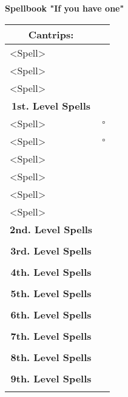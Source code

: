 \documentclass[11pt]{article}
\newcommand{\done}{\rlap{$\square$}{\raisebox{2pt}{\large\hspace{1pt}\ding{51}}}}
\newcommand{\available}{$\square$}
\begin{document}
	\begin{center}
{\LARGE \textbf{Spellbook "If you have one"}}
	\end{center}

	\begin{tabularx}{\textwidth}{X|r}
\multicolumn{1}{c|}{\large \textbf{Cantrips}:} & \\
\hline
<Spell> 										& 	\\
<Spell> 										& 	\\
<Spell>		 									&	\\

\multicolumn{1}{c|}{\large \textbf{1st. Level Spells}} & \\
\hline
<Spell>			 								& \available \\
<Spell> 										& \available \\
<Spell>											& \done \\
<Spell> 										& \done \\
<Spell>				 							& \done \\
<Spell> 										& \done \\

\multicolumn{1}{c|}{\large \textbf{2nd. Level Spells}} &	\\
\hline
												&	\\

\multicolumn{1}{c|}{\large \textbf{3rd. Level Spells}} & \\
\hline
 												&  	\\

\multicolumn{1}{c|}{\large \textbf{4th. Level Spells}} & \\
\hline
 												&  	\\

\multicolumn{1}{c|}{\large \textbf{5th. Level Spells}} & \\
\hline
	 											&  	\\

\multicolumn{1}{c|}{\large \textbf{6th. Level Spells}} & \\
\hline
	 											&  	\\

\multicolumn{1}{c|}{\large \textbf{7th. Level Spells}} & \\
\hline
	 											&  	\\

\multicolumn{1}{c|}{\large \textbf{8th. Level Spells}} & \\
\hline
	 											&  	\\

\multicolumn{1}{c|}{\large \textbf{9th. Level Spells}} & \\
\hline
	 											&
	\end{tabularx}
\end{document}
